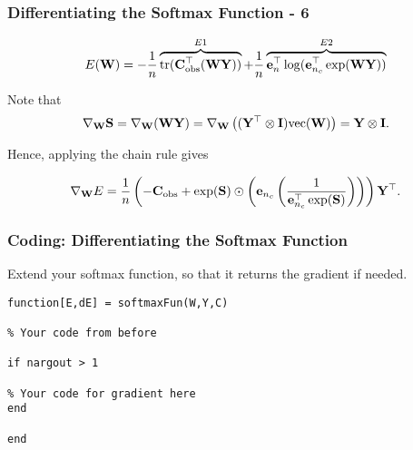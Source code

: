 \documentclass[12pt,fleqn,handout]{beamer}
\begin{document}
\begin{frame}[fragile]\frametitle{Differentiating the Softmax Function - 6}

$$ E({\bf W}) = -\frac{1}{n}\overbrace{{\rm tr}({\bf C}_{\rm obs}^{\top} ({\bf W}{\bf Y}))}^{E1} + \frac{1}{n} \overbrace{{\bf e}_n^{\top}\log({\bf e}_{n_c}^\top \exp({\bf W}{\bf Y}))}^{E2}  $$

\bigskip
Note that
$$
	\nabla_{{\bf W}} {\bf S} = \nabla_{{\bf W}} ({\bf W} {\bf Y}) = \nabla_{{\bf W}} \left( ({\bf Y}^\top \otimes {\bf I}) {\rm vec}({\bf W}) \right) = {\bf Y} \otimes {\bf I}. 
$$


\bigskip

Hence, applying the chain rule gives
     
$$     \nabla_{{\bf W}}E = \frac{1}{n} \left( -{\bf C}_{\rm obs} + \exp({\bf S}) \odot 
\left( {\bf e}_{n_c} \left({\frac {1}{{\bf e}_{n_c}^\top \exp({\bf S})}}\right)\right) \right){\bf Y}^\top. $$
     

\end{frame}


\begin{frame}[fragile]\frametitle{Coding: Differentiating the Softmax Function}

Extend your softmax function, so that it returns the gradient if needed.

\begin{verbatim}
function[E,dE] = softmaxFun(W,Y,C)

% Your code from before

if nargout > 1

% Your code for gradient here
end

end
\end{verbatim}

\end{frame}
\end{document}
